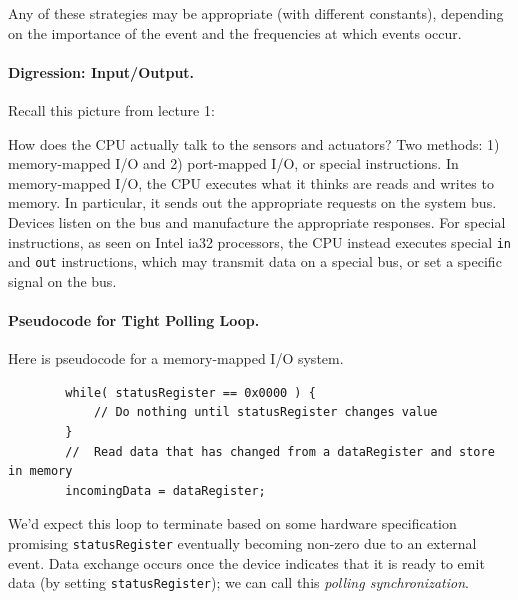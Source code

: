 Any of these strategies may be appropriate (with different constants),
depending on the importance of the event and the frequencies at which
events occur.

\vspace*{-1em}
\paragraph{Digression: Input/Output.} Recall this picture from lecture 1:

\begin{center}
\end{center}

How does the CPU actually talk to the sensors and actuators?  Two
methods: 1) memory-mapped I/O and 2) port-mapped I/O, or special
instructions.  In memory-mapped I/O, the CPU executes what it thinks
are reads and writes to memory. In particular, it sends out the
appropriate requests on the system bus. Devices listen on the bus and
manufacture the appropriate responses. For special instructions, as seen
on Intel ia32 processors, the CPU instead executes special {\tt in} and
{\tt out} instructions, which may transmit data on a special bus,
or set a specific signal on the bus.

\paragraph{Pseudocode for Tight Polling Loop.} 
Here is pseudocode for a memory-mapped I/O system.
\begin{verbatim}
        while( statusRegister == 0x0000 ) {
            // Do nothing until statusRegister changes value
        }
        //  Read data that has changed from a dataRegister and store in memory
        incomingData = dataRegister;
\end{verbatim}
We'd expect this loop to terminate based on some hardware specification
promising {\tt statusRegister} eventually becoming non-zero due to an
external event. Data exchange occurs once the device indicates that
it is ready to emit data (by setting {\tt statusRegister}); we can
call this \emph{polling synchronization}.

